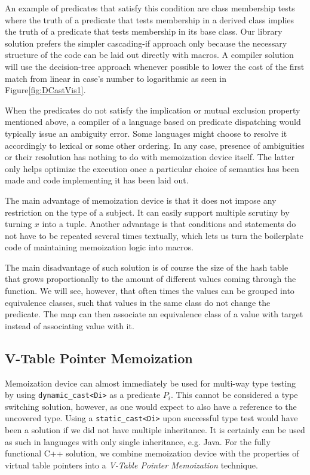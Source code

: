 \documentclass[preprint]{sigplanconf}
\makeatletter
\DeclareRobustCommand{\code}[1]{{\lstinline[breaklines=false,escapechar=@]{#1}}}
\makeatother
\begin{document}
\noindent
An example of predicates that satisfy this condition are class membership tests
where the truth of a predicate that tests membership in a derived class implies 
the truth of a predicate that tests membership in its base class. Our library 
solution prefers the simpler cascading-if approach only because the necessary 
structure of the code can be laid out directly with macros. A compiler solution 
will use the decision-tree approach whenever possible to lower the cost of the 
first match from linear in case's number to logarithmic as seen in Figure\ref{fig:DCastVis1}.

When the predicates do not satisfy the implication or mutual exclusion property 
mentioned above, a compiler of a language based on predicate dispatching would 
typically issue an ambiguity error. Some languages might choose to resolve it 
accordingly to lexical or some other ordering. In any case, presence of 
ambiguities or their resolution has nothing to do with memoization device 
itself. The latter only helps optimize the execution once a particular choice of 
semantics has been made and code implementing it has been laid out.

The main advantage of memoization device is that it does not impose any 
restriction on the type of a subject. It can easily support multiple scrutiny 
by turning $x$ into a tuple. Another advantage is that conditions and statements 
do not have to be repeated several times textually, which lets us turn the 
boilerplate code of maintaining memoization logic into macros.

The main disadvantage of such solution is of course the size of the hash table 
that grows proportionally to the amount of different values coming through the 
function. We will see, however, that often times the values can be grouped into 
equivalence classes, such that values in the same class do not change the 
predicate. The map can then associate an equivalence class of a value with 
target instead of associating value with it.

\subsection{V-Table Pointer Memoization}
\label{sec:vtblmem}

Memoization device can almost immediately be used for multi-way type testing by 
using \code{dynamic_cast<Di>} as a predicate $P_i$. This cannot be considered a 
type switching solution, however, as one would expect to also have a reference 
to the uncovered type. Using a \code{static_cast<Di>} upon successful type test 
would have been a solution if we did not have multiple inheritance. It is 
certainly can be used as such in languages with only single inheritance, e.g. 
Java. For the fully functional C++ solution, we combine memoization device with 
the properties of virtual table pointers into a \emph{V-Table Pointer 
Memoization} technique.
\end{document}
